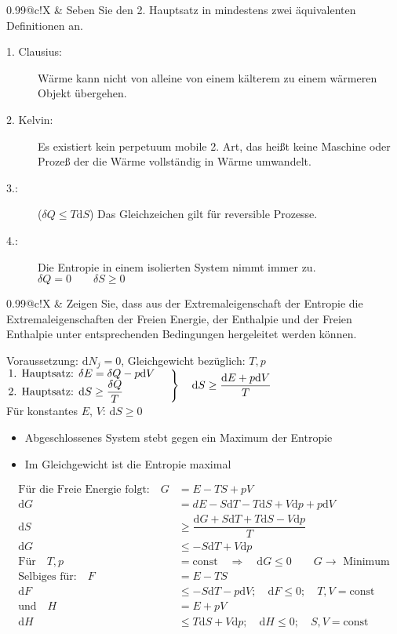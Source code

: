 \documentclass[a4paper,12pt]{scrartcl}
\makeatletter
\def\const{\mathrm{const}}				%
\def\d{\mathrm{d}}					%
\newcounter{qc}\setcounter{qc}{1}
\newenvironment{fshaded}{
\def\FrameCommand{\fcolorbox{framecolor}{shadecolor}}
\MakeFramed {\FrameRestore}}
{\endMakeFramed}
\def\frage#1{
\begin{fshaded}
\noindent
\begin{tabularx}{0.99\textwidth}{@{}c!{\color{framecolor}\vline}X}
{ \bf \rm \theqc }	&	\noindent #1
\end{tabularx}
\stepcounter{qc}
\end{fshaded}
}
\makeatother
\begin{document}
\frage{Seben Sie den 2. Hauptsatz in mindestens zwei äquivalenten Definitionen an.}
\noindent
\begin{description}
\item[1. Clausius:] Wärme kann nicht von alleine von einem kälterem zu einem wärmeren Objekt übergehen.
\item[2. Kelvin:] Es existiert kein perpetuum mobile 2. Art, das heißt keine Maschine oder Prozeß der die Wärme vollständig in 
Wärme umwandelt.
\item[3.:]($\delta Q\leq T\d S$) Das Gleichzeichen gilt für reversible Prozesse.
\item[4.:]Die Entropie in einem isolierten System nimmt immer zu. $\delta Q=0\qquad\delta S\geq 0$
\end{description}

\frage{Zeigen Sie, dass aus der Extremaleigenschaft der Entropie die Extremaleigenschaften der Freien Energie, der Enthalpie 
und der Freien Enthalpie unter entsprechenden Bedingungen hergeleitet werden können.}
\noindent
Voraussetzung: $\d N_j=0$, Gleichgewicht bezüglich: $T,p$\\
$\left.{
	\begin{minipage}[c]{5.2cm}
		1. Hauptsatz: $\delta E=\delta Q-p\d V$\\
		2. Hauptsatz: $\d S\geq\dfrac{\delta Q}{T}$
	\end{minipage}
}\right\}\quad\d S \geq \dfrac{\d E+p\d V}T$\\
Für konstantes $E$, $V$: $\d S\geq0$
\begin{itemize}
	\item Abgeschlossenes System stebt gegen ein Maximum der Entropie
	\item Im Gleichgewicht ist die Entropie maximal
\end{itemize}
\begin{align*}
	\mbox{Für die Freie Energie folgt:}\quad G&=E-TS+pV\\
	\d G&=dE-S\d T-T\d S+V\d p+p\d V\\
	\d S &\geq \dfrac{\d G+S\d T+T\d S-V\d p}T\\
	\d G&\leq-S\d T+V\d p\\
	\text{Für}\quad T, p&=\const\quad\Rightarrow\quad\d G\leq 0\qquad G\rightarrow\text{ Minimum}\\
	\text{Selbiges für:}\quad F&=E-TS\\
	\d F&\leq-S\d T-p\d V;\quad\d F\leq0;\quad T,V=\const\\
	\text{und}\quad H&=E+pV\\
	\d H&\leq T\d S+V\d p;\quad\d H\leq0;\quad S,V=\const
\end{align*}
\end{document}
